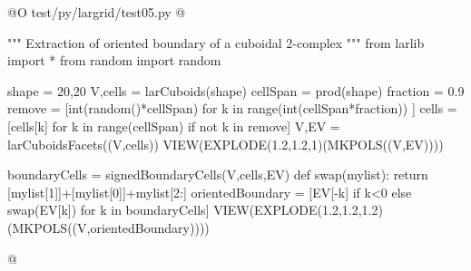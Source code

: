 \documentclass[11pt,oneside]{article}	%
\begin{document}
@O test/py/largrid/test05.py
@{""" Extraction of oriented boundary of a cuboidal 2-complex """
from larlib import *
from random import random

shape = 20,20
V,cells = larCuboids(shape)
cellSpan = prod(shape)
fraction = 0.9
remove = [int(random()*cellSpan) for k in range(int(cellSpan*fraction)) ]
cells = [cells[k] for k in range(cellSpan) if not k in remove]
V,EV = larCuboidsFacets((V,cells))
VIEW(EXPLODE(1.2,1.2,1)(MKPOLS((V,EV))))

boundaryCells = signedBoundaryCells(V,cells,EV)
def swap(mylist): return [mylist[1]]+[mylist[0]]+mylist[2:]
orientedBoundary = [EV[-k] if k<0 else swap(EV[k]) for k in boundaryCells]
VIEW(EXPLODE(1.2,1.2,1.2)(MKPOLS((V,orientedBoundary))))

@}
\end{document}
